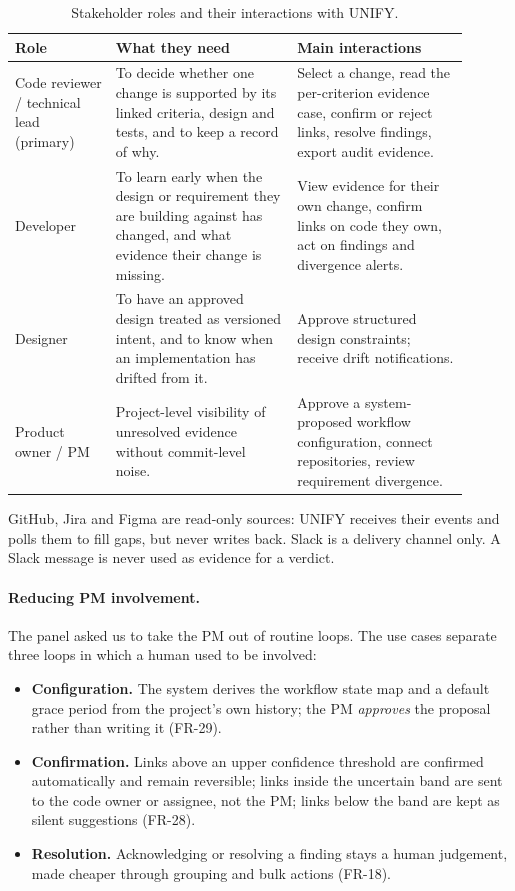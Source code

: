 \begin{table}[htbp]
\centering
\small
\begin{tabular}{>{\raggedright\arraybackslash}p{0.2\linewidth} >{\raggedright\arraybackslash}p{0.36\linewidth} >{\raggedright\arraybackslash}p{0.34\linewidth}}
\hline
\textbf{Role} & \textbf{What they need} & \textbf{Main interactions} \\
\hline
Code reviewer / technical lead (primary) &
  To decide whether one change is supported by its linked criteria, design and
  tests, and to keep a record of why. &
  Select a change, read the per-criterion evidence case, confirm or reject
  links, resolve findings, export audit evidence. \\
Developer &
  To learn early when the design or requirement they are building against has
  changed, and what evidence their change is missing. &
  View evidence for their own change, confirm links on code they own, act on
  findings and divergence alerts. \\
Designer &
  To have an approved design treated as versioned intent, and to know when an
  implementation has drifted from it. &
  Approve structured design constraints; receive drift notifications. \\
Product owner / PM &
  Project-level visibility of unresolved evidence without commit-level noise. &
  Approve a system-proposed workflow configuration, connect repositories,
  review requirement divergence. \\
\hline
\end{tabular}
\caption{Stakeholder roles and their interactions with UNIFY.}\label{tab:roles}
\end{table}

GitHub, Jira and Figma are read-only sources: UNIFY receives their events and
polls them to fill gaps, but never writes back. Slack is a delivery channel
only. A Slack message is never used as evidence for a verdict.

\paragraph{Reducing PM involvement.}
The panel asked us to take the PM out of routine loops. The use cases separate
three loops in which a human used to be involved:
\begin{itemize}
  \item \textbf{Configuration.} The system derives the workflow state map and a
        default grace period from the project's own history; the PM
        \emph{approves} the proposal rather than writing it (FR-29).
  \item \textbf{Confirmation.} Links above an upper confidence threshold are
        confirmed automatically and remain reversible; links inside the
        uncertain band are sent to the code owner or assignee, not the PM; links
        below the band are kept as silent suggestions (FR-28).
  \item \textbf{Resolution.} Acknowledging or resolving a finding stays a human
        judgement, made cheaper through grouping and bulk actions (FR-18).
\end{itemize}

